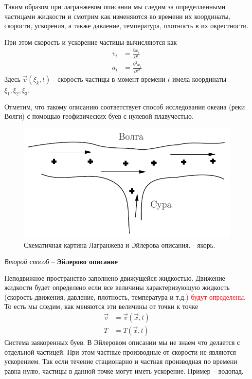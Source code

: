 Таким образом при лагранжевом описании мы следим за определленными частицами жидкости и смотрим как изменяются во времени их координаты,  скорости, ускорения, а также давление, температура, плотность в их окрестности.

При этом скорость и ускорение частицы вычисляются как
\begin{align*}
v_{i} &=\frac{\partial x_{i}}{\partial t} \\
a_{i} &=\frac{\partial^{2} x_{i}}{\partial t^{2}} 
\end{align*}
Здесь $ \vec{v}\left(\xi_{k}, t\right) $ - скорость частицы в момент времени $t$ имела координаты $\xi_1,\xi_2,\xi_3$.

Отметим, что такому описанию соответствует способ исследования океана (реки Волги) с помощью геофизических буев с нулевой плавучестью.
\begin{figure}[H]
	\centering
	\includegraphics[scale=1]{photo/3.pdf}
	\caption{Схематичная картина Лагранжева и Эйлерова описания.  - якорь.}
	\label{fig:figure3}
\end{figure}
\begin{center}
	{\emph{Второй способ} – \textbf{Эйлерово описание}}
\end{center}

Неподвижное пространство заполнено движущейся жидкостью. Движение жидкости будет определено если все величины характеризующую жидкость (скорость движения, давление, плотность, температура и т.д.) \textcolor{red}{будут определены}.
То есть мы следим, как меняются эти величины от точки к точке
\begin{align*} 
\vec{v} &=\vec{v}(\vec{x}, t) \\
T &=T(\vec{x}, t)
\end{align*}
Система заякоренных буев. 
В Эйлеровом описании мы не знаем что делается с отдельной частицей. При этом частные производные от скорости не являются ускорением. Так если течение стационарно и частная производная по времени  равна нулю, частицы в данной точке могут иметь ускорение. Пример – водопад.

